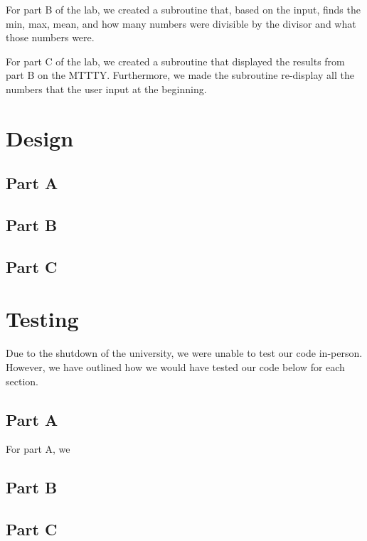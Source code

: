 \documentclass[10pt, letterpaper, titlepage]{article} %
\begin{document}
\begin{multicols*}{2}
For part B of the lab, we created a subroutine that, based on the input, finds the min, max, mean, and how many numbers were divisible by the divisor and what those numbers were.

For part C of the lab, we created a subroutine that displayed the results from part B on the MTTTY. 
Furthermore, we made the subroutine re-display all the numbers that the user input at the beginning. 

\section{Design}
\subsection{Part A}


\subsection{Part B}


\subsection{Part C}


\section{Testing}
Due to the shutdown of the university, we were unable to test our code in-person. However, we have outlined how we would have tested our code below for each section.

\subsection{Part A}
For part A, we

\subsection{Part B}


\subsection{Part C}



\end{multicols*}
\end{document}

